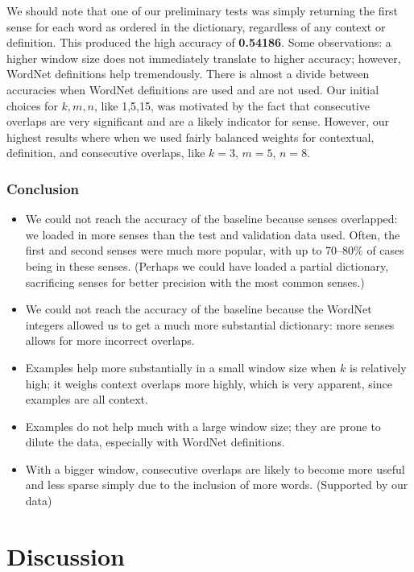 \documentclass{article}
\begin{document}
We should note that one of our preliminary tests was simply returning the first sense for each word as ordered in the dictionary, regardless of any context or definition. This produced the high accuracy of \textbf{0.54186}. Some observations: a higher window size does not immediately translate to higher accuracy; however, WordNet definitions help tremendously. There is almost a divide between accuracies when WordNet definitions are used and are not used. Our initial choices for $k,m,n$, like 1,5,15, was motivated by the fact that consecutive overlaps are very significant and are a likely indicator for sense. However, our highest results where when we used fairly balanced weights for contextual, definition, and consecutive overlaps, like $k=3$, $m=5$, $n=8$.

\subsubsection{Conclusion}

\begin{itemize}
\item We could not reach the accuracy of the baseline because senses overlapped: we loaded in more senses than the test and validation data used. Often, the first and second senses were much more popular, with up to 70--80\% of cases being in these senses. (Perhaps we could have loaded a partial dictionary, sacrificing senses for better precision with the most common senses.)
\item We could not reach the accuracy of the baseline because the WordNet integers allowed us to get a much more substantial dictionary: more senses allows for more incorrect overlaps.
\item Examples help more substantially in a small window size when $k$ is relatively high; it weighs context overlaps more highly, which is very apparent, since examples are all context.
\item Examples do not help much with a large window size; they are prone to dilute the data, especially with WordNet definitions.
\item With a bigger window, consecutive overlaps are likely to become more useful and less sparse simply due to the inclusion of more words. (Supported by our data)
\end{itemize}

\section{Discussion}
\end{document}
